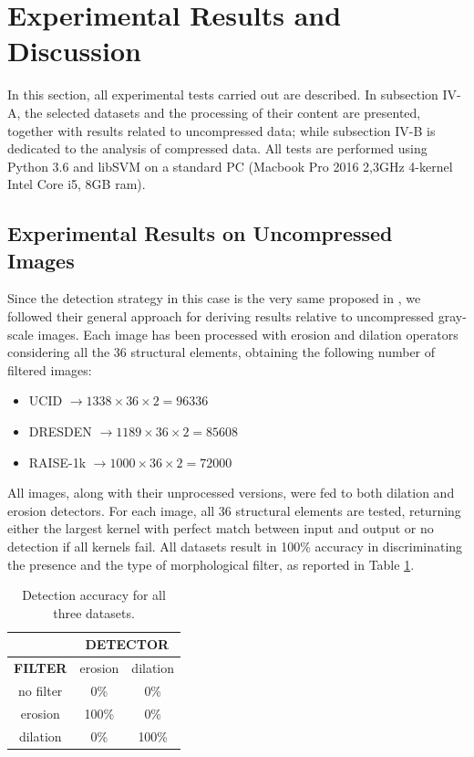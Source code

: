 \documentclass[review]{elsarticle}
\begin{document}
\section{Experimental Results and Discussion}

In this section, all experimental tests carried out are described. In subsection IV-A, the selected datasets and the processing of their content are presented, together with results related to uncompressed data; while subsection IV-B is dedicated to the analysis of compressed data. All  tests are performed using Python 3.6 and libSVM on a standard PC (Macbook Pro 2016 2,3GHz 4-kernel Intel Core i5, 8GB ram).


\subsection{Experimental Results on Uncompressed Images}

Since the detection strategy in this case is the very same proposed in \cite{de2017detecting}, we followed their general approach for deriving results relative to uncompressed gray-scale images. Each image has been processed with erosion and dilation operators considering all the 36 structural elements, obtaining the following number of filtered images:

\begin{itemize}
	\item UCID $\rightarrow 1338\times 36 \times 2 = 96336$
	\item DRESDEN $\rightarrow 1189\times 36\times 2 = 85608$
	\item RAISE-1k $\rightarrow 1000\times 36\times 2 = 72000$
\end{itemize}

All images, along with their unprocessed versions, were fed to both dilation and erosion detectors. For each image, all 36 structural elements are tested, returning either the largest kernel with perfect match between input and output or no detection if all kernels fail. All datasets result in 100\% accuracy in discriminating the presence and the type of morphological filter, as reported in Table \ref{tab1:det_acc}.

\begin{table}[!ht]
	\centering
	\caption{Detection accuracy for all three datasets.}
	\label{tab1:det_acc}
	\begin{tabular}{|l|l|l}
		\cline{2-3}
		\multicolumn{1}{c|}{}		     & \multicolumn{2}{c|}{\textbf{DETECTOR}}	           				    \\ \hline
		\multicolumn{1}{|c||}{\textbf{FILTER}}    & \multicolumn{1}{c|}{erosion} & \multicolumn{1}{c|}{dilation} \\ \hline
		\multicolumn{1}{|c||}{no filter} & \multicolumn{1}{c|}{0\%} 	& \multicolumn{1}{c|}{0\%}      \\ \hline
		\multicolumn{1}{|c||}{erosion}   & \multicolumn{1}{c|}{100\%}   & \multicolumn{1}{c|}{0\%}      \\ \hline
		\multicolumn{1}{|c||}{dilation}  & \multicolumn{1}{c|}{0\%}     & \multicolumn{1}{c|}{100\%}    \\ \hline
	\end{tabular}
\end{table}
\end{document}
